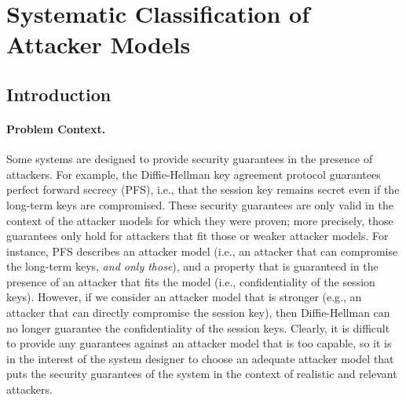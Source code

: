\chapter{Systematic Classification of Attacker Models}
\label{ch:Classification}
{\color{red}
\section{Introduction}
\label{sec:Introduction}
\subsubsection{Problem Context.} 
Some systems are designed to provide security guarantees in the presence of attackers. For example, the Diffie-Hellman key agreement protocol guarantees perfect forward secrecy \cite{Gunther1990,Menezes1996} (PFS), i.e., that the session key remains secret even if the long-term keys are compromised. These security guarantees are only valid in the context of the attacker models for which they were proven; more precisely, those guarantees only hold for attackers that fit those or weaker attacker models. For instance, PFS describes an attacker model (i.e., an attacker that can compromise the long-term keys, \emph{and only those}), and a property that is guaranteed in the presence of an attacker that fits the model (i.e., confidentiality of the session keys). However, if we consider an attacker model that is stronger (e.g., an attacker that can directly compromise the session key), then Diffie-Hellman can no longer guarantee the confidentiality of the session keys. Clearly, it is difficult to provide any guarantees against an attacker model that is too capable, so it is in the interest of the system designer to choose an adequate attacker model that puts the security guarantees of the system in the context of realistic and relevant attackers.

}
